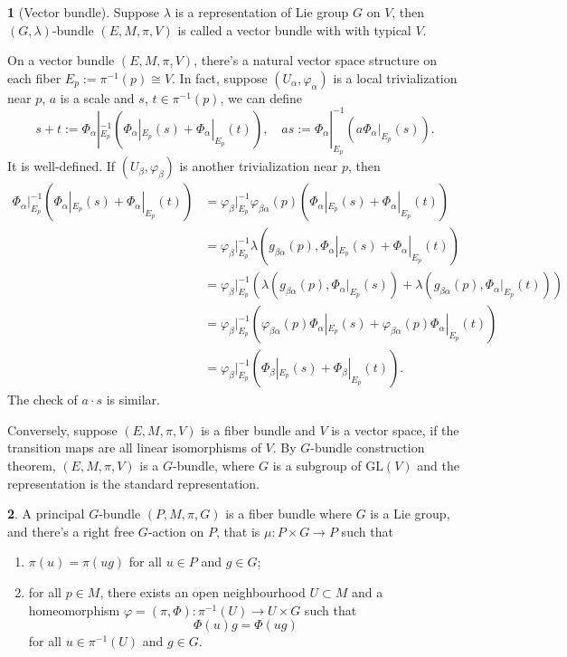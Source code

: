 \documentclass[11pt]{article}
\theoremstyle{definition}
\newtheorem{para}{}[part]
\begin{document}
\begin{para}[Vector bundle]
	Suppose $\lambda$ is a representation of Lie group $G$ on $V$, then $(G,\lambda)$-bundle $(E,M,\pi,V)$ is called a vector bundle with with typical $V$.

	On a vector bundle $(E,M,\pi,V)$, there's a natural vector space structure on each fiber $E_p:=\pi^{-1}(p)\cong V$. In fact, suppose $(U_\alpha,\varphi_\alpha)$ is a local trivialization near $p$, $a$ is a scale and $s$, $t\in \pi^{-1}(p)$, we can define
	\[
	s+t:=\Phi_{\alpha}|_{E_p}^{-1}\left(\Phi_{\alpha}|_{E_p}(s)+\Phi_{\alpha}|_{E_p}(t)\right),\quad as:=\Phi_{\alpha}|_{E_p}^{-1}\left(a\Phi_{\alpha}|_{E_p}(s)\right).
	\]
	It is well-defined. If $(U_\beta,\varphi_\beta)$ is another trivialization near $p$, then
	\[
	\begin{aligned}
	\Phi_{\alpha}|_{E_p}^{-1}\left(\Phi_{\alpha}|_{E_p}(s)+\Phi_{\alpha}|_{E_p}(t)\right)&=\varphi_\beta|_{E_p}^{-1}\varphi_{\beta\alpha}(p)\left(\Phi_{\alpha}|_{E_p}(s)+\Phi_{\alpha}|_{E_p}(t)\right)\\
	&=\varphi_\beta|_{E_p}^{-1}\lambda\left(g_{\beta\alpha}(p),\Phi_{\alpha}|_{E_p}(s)+\Phi_{\alpha}|_{E_p}(t)\right)\\
	&=\varphi_\beta|_{E_p}^{-1}\left(\lambda\left(g_{\beta\alpha}(p),\Phi_{\alpha}|_{E_p}(s)\right)+\lambda\left(g_{\beta\alpha}(p),\Phi_{\alpha}|_{E_p}(t)\right)\right)\\
	&=\varphi_\beta|_{E_p}^{-1}\left(\varphi_{\beta\alpha}(p)\Phi_{\alpha}|_{E_p}(s)+\varphi_{\beta\alpha}(p)\Phi_{\alpha}|_{E_p}(t)\right)\\
	&=\varphi_\beta|_{E_p}^{-1}\left(\Phi_{\beta}|_{E_p}(s)+\Phi_{\beta}|_{E_p}(t)\right).
	\end{aligned}
	\]
	The check of $a\cdot s$ is similar.

	Conversely, suppose $(E,M,\pi,V)$ is a fiber bundle and $V$ is a vector space, if the transition maps are all linear isomorphisms of $V$. By $G$-bundle construction theorem, $(E,M,\pi,V)$ is a $G$-bundle, where $G$ is a subgroup of $\mathrm{GL}(V)$ and the representation is the standard representation.
\end{para}

\begin{para}
A principal $G$-bundle $(P,M,\pi,G)$ is a fiber bundle where $G$ is a Lie group, and there's a right free $G$-action on $P$, that is $\mu:P\times G\to P$ such that
\begin{enumerate}
	\item $\pi(u)=\pi(ug)$ for all $u\in P$ and $g\in G$;
	\item for all $p\in M$, there exists an open neighbourhood $U\subset M$ and a homeomorphism $\varphi=(\pi,\Phi):\pi^{-1}(U)\to U\times G$ such that
	\[
	\Phi(u)g=\Phi(ug)
	\]
	for all $u\in \pi^{-1}(U)$ and $g\in G$.
\end{enumerate}
\end{para}
\end{document}
